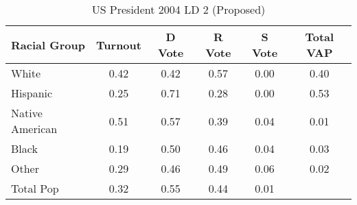 \begin{table}[htb]
\begin{center}
\caption{US President 2004 LD 2 (Proposed)}
\label{pres04_vap_ld_2}
\begin{tabular}{lccccc}
  \hline
Racial Group & Turnout & D Vote & R Vote & S Vote & Total VAP \\ 
  \hline
White & 0.42 & 0.42 & 0.57 & 0.00 & 0.40 \\ 
  Hispanic & 0.25 & 0.71 & 0.28 & 0.00 & 0.53 \\ 
  Native American & 0.51 & 0.57 & 0.39 & 0.04 & 0.01 \\ 
  Black & 0.19 & 0.50 & 0.46 & 0.04 & 0.03 \\ 
  Other & 0.29 & 0.46 & 0.49 & 0.06 & 0.02 \\ 
  Total Pop & 0.32 & 0.55 & 0.44 & 0.01 &  \\ 
   \hline
\end{tabular}
\end{center}
\end{table}
